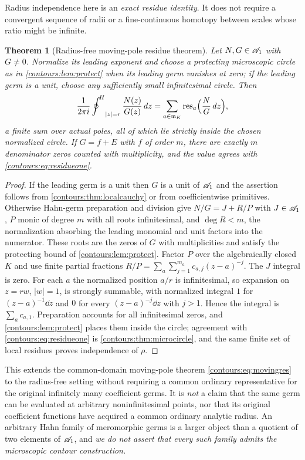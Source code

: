 \documentclass[11pt,letterpaper]{article}
\newtheorem{theorem}{Theorem}[section]
\theoremstyle{definition}
\theoremstyle{remark}
\newcommand{\m}{\mathfrak m}\newcommand{\st}{\operatorname{st}}
\newcommand{\res}{\operatorname{res}}\newcommand{\wind}{\operatorname{wind}}
\newcommand{\HCoint}{\mathop{\oint^{\!H}}\nolimits}
\numberwithin{equation}{section}
\begin{document}
Radius independence here is an \emph{exact residue identity}. It does not require a
convergent sequence of radii or a fine-continuous homotopy between scales whose
ratio might be infinite.

\begin{theorem}[Radius-free moving-pole residue theorem]
\label{contours:thm:localresidue}
Let $N,G\in\mathscr A_1$ with $G\ne0$. Normalize its leading exponent and choose a
protecting microscopic circle as in \cref{contours:lem:protect} when its leading
germ vanishes at zero; if the leading germ is a unit, choose any sufficiently small
infinitesimal circle. Then
\begin{equation}\label{contours:eq:localresidue}
  \frac1{2\pi i}\HCoint_{|z|=r}\frac{N(z)}{G(z)}\dd z
  =\sum_{a\in\m_K}\res_a\Bigl(\frac NG\dd z\Bigr),
\end{equation}
a finite sum over actual poles, all of which lie strictly inside the chosen
normalized circle. If $G=f+E$ with $f$ of order $m$, there are exactly $m$
denominator zeros counted with multiplicity, and the value agrees with
\eqref{contours:eq:residueone}.
\end{theorem}
\begin{proof}
If the leading germ is a unit then $G$ is a unit of $\mathscr A_1$ and the assertion follows
from \cref{contours:thm:localcauchy} or from coefficientwise primitives. Otherwise
Hahn-germ preparation and division \cite[\S4]{Geometry} give $N/G=J+R/P$ with
$J\in\mathscr A_1$, $P$ monic of degree $m$ with all roots infinitesimal, and $\deg R<m$,
the normalization absorbing the leading monomial and unit factors into the
numerator. These roots are the zeros of $G$ with multiplicities and satisfy the
protecting bound of \cref{contours:lem:protect}. Factor $P$ over the algebraically
closed $K$ and use finite partial fractions
$R/P=\sum_a\sum_{j=1}^{m_a}c_{a,j}(z-a)^{-j}$. The $J$ integral is zero. For each
$a$ the normalized position $a/r$ is infinitesimal, so expansion on $z=rw$,
$|w|=1$, is strongly summable, with normalized integral $1$ for $(z-a)^{-1}\dd z$
and $0$ for every $(z-a)^{-j}\dd z$ with $j>1$. Hence the integral is
$\sum_ac_{a,1}$. Preparation accounts for all infinitesimal zeros, and
\cref{contours:lem:protect} places them inside the circle; agreement with
\eqref{contours:eq:residueone} is \cref{contours:thm:microcircle}, and the same
finite set of local residues proves independence of $\rho$.
\end{proof}

This extends the common-domain moving-pole theorem \eqref{contours:eq:movingres} to
the radius-free setting without requiring a common ordinary representative for the
original infinitely many coefficient germs. It is \emph{not} a claim that the same
germ can be evaluated at arbitrary noninfinitesimal points, nor that its original
coefficient functions have acquired a common ordinary analytic radius. An arbitrary
Hahn family of meromorphic germs is a larger object than a quotient of two elements
of $\mathscr A_1$, and \emph{we do not assert that every such family admits the microscopic
contour construction.}
\end{document}
